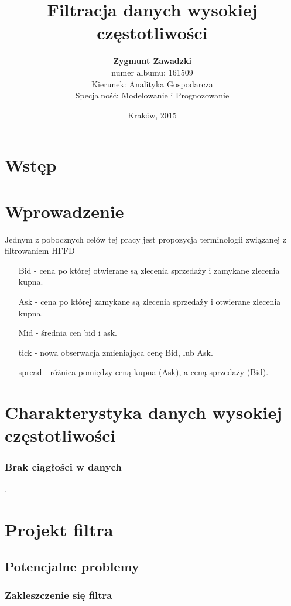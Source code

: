 \documentclass[a4paper,12pt,openany, DIV=calc]{scrbook}
\author{{\LARGE \textbf{Zygmunt Zawadzki}}\\
numer albumu: 161509\\
Kierunek: Analityka Gospodarcza\\
Specjalność: Modelowanie i Prognozowanie}
\title{Filtracja danych wysokiej częstotliwości}
\date{Kraków, 2015}
\begin{document}
\maketitle

\tableofcontents
\chapter*{Wstęp}


\chapter{Wprowadzenie}

Jednym z pobocznych celów tej pracy jest propozycja terminologii związanej z filtrowaniem HFFD

\begin{itemize}

\item[Bid] - cena po której otwierane są zlecenia sprzedaży i zamykane zlecenia kupna.
\item[Ask] - cena po której zamykane są zlecenia sprzedaży i otwierane zlecenia kupna.
\item[Mid] - średnia cen bid i ask.
\item[tick] - nowa obserwacja zmieniająca cenę Bid, lub Ask.
\item[spread] - różnica pomiędzy ceną kupna (Ask), a ceną sprzedaży (Bid).
\end{itemize}

\chapter{Charakterystyka danych wysokiej częstotliwości}

\subsection{Brak ciągłości w danych}.

\chapter{Projekt filtra}

\section{Potencjalne problemy}

\subsection{Zakleszczenie się filtra}
\end{document}
